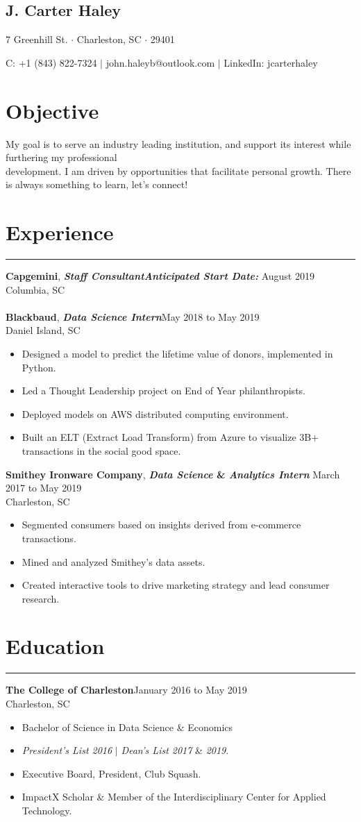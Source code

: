 \documentclass[11pt]{article}
\newcommand{\name}[1]{\begin{center}\section*{\huge #1}\end{center}}
\newcommand{\topinfo}[1]{\begin{center}\vspace{-0.2cm}#1\vspace{-0.2cm}\end{center}}
\newcommand{\resumesection}[1]{\vspace{-0.7cm}\section*{#1}\vspace{-0.2cm}\hrule\vspace{0.2cm}}
\newcommand{\objective}[1]{\section*{#1}\vspace{-0.3cm}}
\begin{document}
\name{J. Carter Haley}
\topinfo{7 Greenhill St. $\cdot$ Charleston, SC $\cdot$  29401}
\topinfo{C: +1 (843) 822-7324 $\vert$ john.haleyb@outlook.com $\vert$ LinkedIn: jcarterhaley}

\objective{Objective}
\setlength\parindent{0cm}
My goal is to serve an industry leading institution, and support its interest while furthering my professional \\development. I am driven by opportunities that facilitate personal growth. There is always something to learn, let's connect! \\

\resumesection{Experience}
\textbf{Capgemini},\textbf{\textit{ Staff Consultant}}\hfill \textbf{\textit{Anticipated Start Date:}} August 2019\\
 Columbia, SC
%
\\
\\
\textbf{Blackbaud},\textbf{\textit{ Data Science Intern}}\hfill May 2018 to May 2019\\
 Daniel Island, SC
\begin{itemize}
	\item Designed a model to predict the lifetime value of donors, implemented in Python.
	\item Led a Thought Leadership project on End of Year philanthropists.
	\item Deployed models on AWS distributed computing environment.
	\item Built an ELT (Extract Load Transform) from Azure to visualize 3B+ transactions in the social good space.\\
\end{itemize}
\textbf{Smithey Ironware Company},\textbf{\textit{ Data Science} \& \textit{Analytics Intern}} \hfill March 2017 to May 2019\\
Charleston, SC
\begin{itemize}
	\item Segmented consumers based on insights derived from e-commerce transactions.
	\item Mined and analyzed Smithey's data assets.
	\item Created interactive tools to drive marketing strategy and lead consumer research.\\
\end{itemize}

\resumesection{Education}
\textbf{The College of Charleston}\hfill January 2016 to May 2019\\
 Charleston, SC
\begin{itemize}
	\item Bachelor of Science in Data Science \& Economics
	\item \textit{President’s List 2016} $\vert$ \textit{Dean’s List 2017} \& \textit{2019}.
	\item  Executive Board, President, Club Squash.
	\item ImpactX Scholar \& Member of the Interdisciplinary Center for Applied Technology.\\
\end{itemize}
\end{document}

